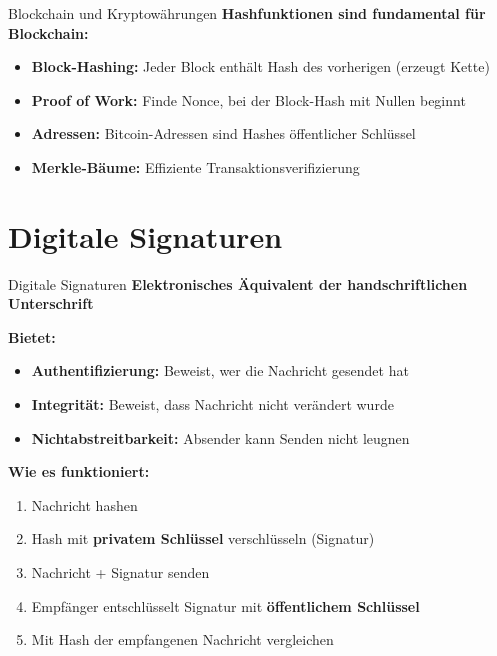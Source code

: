 \documentclass[handout]{beamer}
\begin{document}
\begin{frame}{Blockchain und Kryptowährungen}
\textbf{Hashfunktionen sind fundamental für Blockchain:}

\vspace{0.3cm}
\begin{itemize}
    \item \textbf{Block-Hashing:} Jeder Block enthält Hash des vorherigen (erzeugt Kette)
    \item \textbf{Proof of Work:} Finde Nonce, bei der Block-Hash mit Nullen beginnt
    \item \textbf{Adressen:} Bitcoin-Adressen sind Hashes öffentlicher Schlüssel
    \item \textbf{Merkle-Bäume:} Effiziente Transaktionsverifizierung
\end{itemize}

\end{frame}

\section{Digitale Signaturen}

\begin{frame}{Digitale Signaturen}
\textbf{Elektronisches Äquivalent der handschriftlichen Unterschrift}

\vspace{0.3cm}
\textbf{Bietet:}
\begin{itemize}
    \item \textbf{Authentifizierung:} Beweist, wer die Nachricht gesendet hat
    \item \textbf{Integrität:} Beweist, dass Nachricht nicht verändert wurde
    \item \textbf{Nichtabstreitbarkeit:} Absender kann Senden nicht leugnen
\end{itemize}

\vspace{0.3cm}
\textbf{Wie es funktioniert:}
\begin{enumerate}
    \item Nachricht hashen
    \item Hash mit \textbf{privatem Schlüssel} verschlüsseln (Signatur)
    \item Nachricht + Signatur senden
    \item Empfänger entschlüsselt Signatur mit \textbf{öffentlichem Schlüssel}
    \item Mit Hash der empfangenen Nachricht vergleichen
\end{enumerate}

\end{frame}
\end{document}
